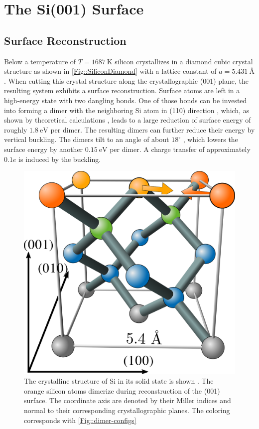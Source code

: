 	\chapter{The Si(001) Surface} \label{Section::Silicon}
	\section{Surface Reconstruction}
	Below a temperature of $T =	1687~\text{K}$ silicon crystallizes in a diamond cubic crystal structure as shown in \autoref{Fig::SiliconDiamond} with a lattice constant of $a =	5.431~\text{\AA} $ \cite{tiesinga2021codata}. When cutting this crystal structure along the crystallographic (001) plane, the resulting system exhibits a surface reconstruction. Surface atoms are left in a high-energy state with two dangling bonds. One of those bonds can be invested into forming a dimer with the neighboring Si atom in (110) direction \cite{chadi1979atomic}, which, as shown by theoretical calculations \cite{ramstad1995theoretical, batra1990atomic, dabrowski1992self}, leads to a large reduction of surface energy of roughly $1.8~\text{eV}$ per dimer.	The resulting dimers can further reduce their energy by vertical buckling. The dimers tilt to an angle of about $18^\circ$ \cite{ramstad1995theoretical, pillay2004revisit}, which lowers the surface energy by another $0.15~\text{eV}$ \cite{inoue1994order} per dimer. A charge transfer of approximately $0.1 e$  \cite{brand2023critical, landemark1992core} is induced by the buckling. \begin{figure}
		\centering
		\includegraphics[width=\linewidth]{graphics/Sili-color.png}
		\caption{The crystalline structure of Si in its solid state is shown \cite{sistrucure}.  The orange silicon atoms dimerize during reconstruction of the (001) surface. The coordinate axis are denoted by their Miller indices and normal to their corresponding crystallographic planes. The coloring corresponds with \autoref{Fig::dimer-configs}}
		\label{Fig::SiliconDiamond}
	\end{figure} \\
